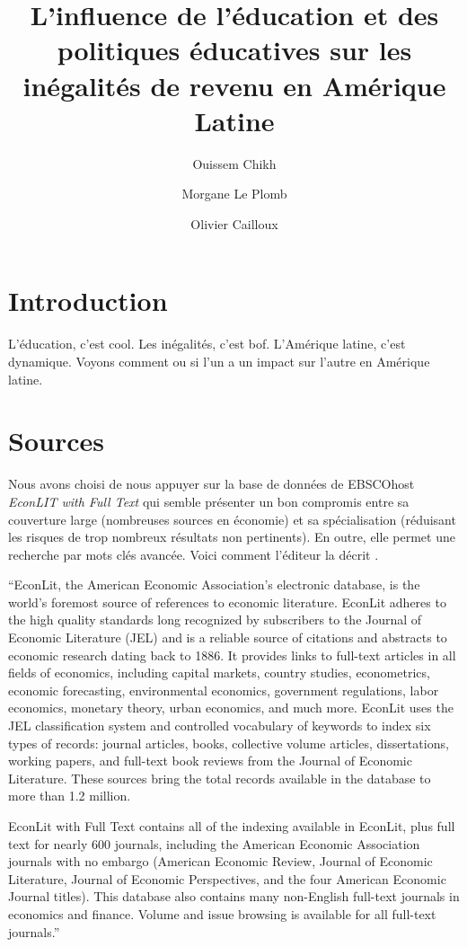 \documentclass[pagesize, twoside=off, bibliography=totoc, DIV=calc, fontsize=12pt, a4paper, french]{scrartcl}
\title{L’influence de l’éducation et des politiques éducatives sur les inégalités de revenu en Amérique Latine}
\author{Ouissem Chikh}
\author{Morgane Le Plomb}
\author{Olivier Cailloux}
\affil{Université Paris-Dauphine, PSL Research University, CNRS, 75016 PARIS, FRANCE}
\begin{document}
\maketitle

\section{Introduction}
\label{sec:motiv}
L’éducation, c’est cool.
Les inégalités, c’est bof.
L’Amérique latine, c’est dynamique.
Voyons comment ou si l’un a un impact sur l’autre en Amérique latine.

\appendix
\section{Sources}
Nous avons choisi de nous appuyer sur la base de données de EBSCOhost \emph{EconLIT with Full Text} qui semble présenter un bon compromis entre sa couverture large (nombreuses sources en économie) et sa spécialisation (réduisant les risques de trop nombreux résultats non pertinents). En outre, elle permet une recherche par mots clés avancée.
Voici comment l’éditeur la décrit \citep{ebscohost_econlit_2024}.

“EconLit, the American Economic Association's electronic database, is the world's foremost source of references to economic literature. EconLit adheres to the high quality standards long recognized by subscribers to the Journal of Economic Literature (JEL) and is a reliable source of citations and abstracts to economic research dating back to 1886. It provides links to full-text articles in all fields of economics, including capital markets, country studies, econometrics, economic forecasting, environmental economics, government regulations, labor economics, monetary theory, urban economics, and much more. EconLit uses the JEL classification system and controlled vocabulary of keywords to index six types of records: journal articles, books, collective volume articles, dissertations, working papers, and full-text book reviews from the Journal of Economic Literature. These sources bring the total records available in the database to more than 1.2 million.

EconLit with Full Text contains all of the indexing available in EconLit, plus full text for nearly 600 journals, including the American Economic Association journals with no embargo (American Economic Review, Journal of Economic Literature, Journal of Economic Perspectives, and the four American Economic Journal titles). This database also contains many non-English full-text journals in economics and finance. Volume and issue browsing is available for all full-text journals.”
\end{document}
